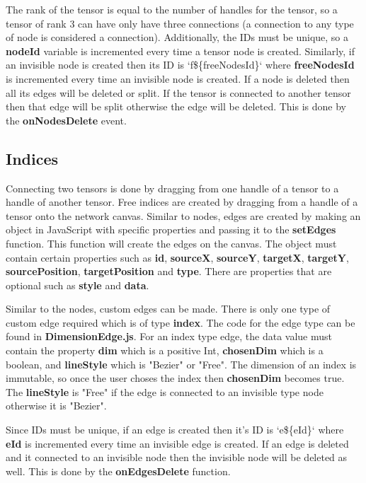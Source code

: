 \documentclass{juliacon}
\begin{document}
\begin{appendix}
The rank of the tensor is equal to the number of handles for the tensor, so a tensor of rank 3 can have only have three connections (a connection to any type of node is considered a connection). Additionally, the IDs must be unique, so a \textbf{nodeId} variable is incremented every time a tensor node is created. Similarly, if an invisible node is created then its ID is `f\$\{freeNodesId\}` where \textbf{freeNodesId} is incremented every time an invisible node is created. If a node is deleted then all its edges will be deleted or split. If the tensor is connected to another tensor then that edge will be split otherwise the edge will be deleted. This is done by the \textbf{onNodesDelete} event.

\subsection{Indices}
Connecting two tensors is done by dragging from one handle of a tensor to a handle of another tensor. Free indices are created by dragging from a handle of a tensor onto the network canvas.
Similar to nodes, edges are created by making an object in JavaScript with specific properties and passing it to the \textbf{setEdges} function. This function will create the edges on the canvas. The object must contain certain properties such as \textbf{id}, \textbf{sourceX}, \textbf{sourceY}, \textbf{targetX}, \textbf{targetY}, \textbf{sourcePosition}, \textbf{targetPosition} and \textbf{type}. There are properties that are optional such as \textbf{style} and \textbf{data}.

Similar to the nodes, custom edges can be made. There is only one type of custom edge required which is of type \textbf{index}. The code for the edge type can be found in \textbf{DimensionEdge.js}. For an index type edge, the data value must contain the property \textbf{dim} which is a positive Int, \textbf{chosenDim} which is a boolean, and \textbf{lineStyle} which is "Bezier" or "Free". The dimension of an index is immutable, so once the user choses the index then \textbf{chosenDim} becomes true. The \textbf{lineStyle} is "Free" if the edge is connected to an invisible type node otherwise it is "Bezier".

Since IDs must be unique, if an edge is created then it's ID is `e\$\{eId\}` where \textbf{eId} is incremented every time an invisible edge is created. If an edge is deleted and it connected to an invisible node then the invisible node will be deleted as well. This is done by the \textbf{onEdgesDelete} function.



\end{appendix}
\end{document}
